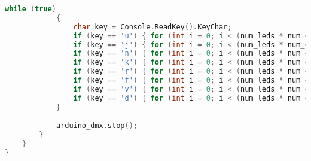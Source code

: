 \begin{lstlisting}[language=C++]
            while (true)
            {
                char key = Console.ReadKey().KeyChar;
                if (key == 'u') { for (int i = 0; i < (num_leds * num_channels); i += num_channels) { arduino_dmx.setDmxValue(1 + i, 255); } }
                if (key == 'j') { for (int i = 0; i < (num_leds * num_channels); i += num_channels) { arduino_dmx.setDmxValue(1 + i, 200); } }
                if (key == 'n') { for (int i = 0; i < (num_leds * num_channels); i += num_channels) { arduino_dmx.setDmxValue(1 + i, 100); } }
                if (key == 'k') { for (int i = 0; i < (num_leds * num_channels); i += num_channels) { arduino_dmx.setDmxValue(1 + i, 0); } }
                if (key == 'r') { for (int i = 0; i < (num_leds * num_channels); i += num_channels) { arduino_dmx.setDmxValue(3 + i, 170); } }
                if (key == 'f') { for (int i = 0; i < (num_leds * num_channels); i += num_channels) { arduino_dmx.setDmxValue(3 + i, 80); } }
                if (key == 'v') { for (int i = 0; i < (num_leds * num_channels); i += num_channels) { arduino_dmx.setDmxValue(3 + i, 30); } }
                if (key == 'd') { for (int i = 0; i < (num_leds * num_channels); i += num_channels) { arduino_dmx.setDmxValue(3 + i, 0); } }
            }

            arduino_dmx.stop();
        }
    }
}

\end{lstlisting}
